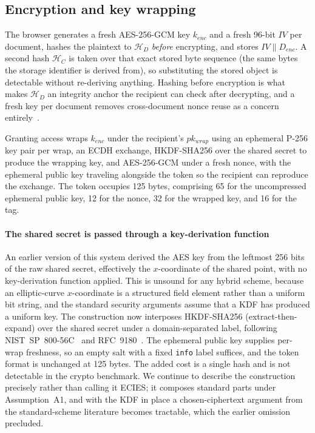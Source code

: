 \documentclass[preprint,12pt]{elsarticle}
\begin{document}
\subsection{Encryption and key wrapping}
\label{sec:docencryption}

The browser generates a fresh AES-256-GCM key $k_{enc}$ and a fresh 96-bit
$\mathit{IV}$ per document, hashes the plaintext to $\mathcal{H}_D$
\emph{before} encrypting, and stores $\mathit{IV} \| D_{enc}$. A second hash
$\mathcal{H}_C$ is taken over that exact stored byte sequence (the same bytes
the storage identifier is derived from), so substituting the stored object is
detectable without re-deriving anything. Hashing before encryption is what makes
$\mathcal{H}_D$ an integrity anchor the recipient can check after decrypting,
and a fresh key per document removes cross-document nonce reuse as a concern
entirely~\cite{nist80038d}.

Granting access wraps $k_{enc}$ under the recipient's $pk_{wrap}$ using an
ephemeral P-256 key pair per wrap, an ECDH exchange, HKDF-SHA256 over the
shared secret to produce the wrapping key, and AES-256-GCM under a fresh nonce,
with the ephemeral public key traveling alongside the token so the recipient
can reproduce the exchange. The token occupies 125 bytes, comprising 65 for the
uncompressed ephemeral public key, 12 for the nonce, 32 for the wrapped key,
and 16 for the tag.

\paragraph{The shared secret is passed through a key-derivation function}
An earlier version of this system derived the AES key from the leftmost 256
bits of the raw shared secret, effectively the $x$-coordinate of the shared
point, with no key-derivation function applied. This is unsound for any hybrid
scheme, because an elliptic-curve $x$-coordinate is a structured field element
rather than a uniform bit string, and the standard security arguments assume
that a KDF has produced a uniform key. The construction now interposes
HKDF-SHA256 (extract-then-expand) over the shared secret under a
domain-separated label, following NIST~SP~800-56C~\cite{nist80056c} and
RFC~9180~\cite{rfc9180}. The ephemeral public key supplies per-wrap freshness,
so an empty salt with a fixed \texttt{info} label suffices, and the token
format is unchanged at 125 bytes. The added cost is a single hash and is not
detectable in the crypto benchmark. We continue to describe the construction
precisely rather than calling it ECIES; it composes standard parts under
Assumption~A1, and with the KDF in place a chosen-ciphertext argument from the
standard-scheme literature becomes tractable, which the earlier omission
precluded.
\end{document}

